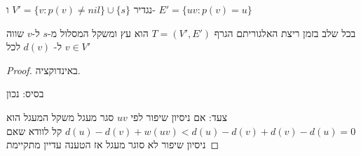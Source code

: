 נגדיר
$V' = \{v : p(v) \neq nil\} \cup \{s\}$
ו-%
$E' = \{uv : p(v) = u\}$
\begin{claim}
בכל שלב בזמן ריצת האלגוריתם הגרף 
$T = (V', E')$
הוא עץ ומשקל המסלול מ-$s$ ל-$v$ שווה ל-%
$d(v)$
לכל 
$v \in V'$
\end{claim}
\begin{proof}
באינדוקציה.

בסיס: נכון

צעד: אם ניסיון שיפור לפי $uv$ סגר מעגל משקל המעגל הוא 
$d(u) - d(v) + w(uv) < d(u) - d(v) + d(v) - d(u) = 0$
קל לוודא שאם ניסיון שיפור לא סוגר מעגל אז הטענה עדיין מתקיימת
\end{proof}
